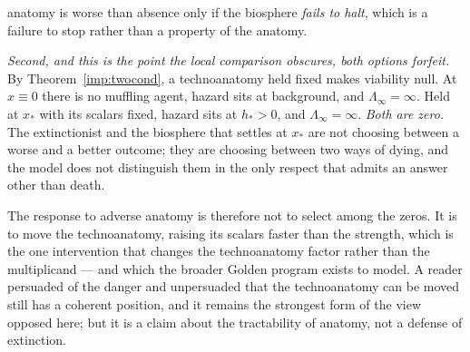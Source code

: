 \begin{remark}
anatomy is worse than absence only if the biosphere \emph{fails to
halt}, which is a failure to stop rather than a property of the anatomy.

\emph{Second, and this is the point the local comparison obscures, both
options forfeit.} By Theorem~\ref{imp:twocond}, a technoanatomy held
fixed makes viability null. At
$x\equiv0$ there is no muffling agent, hazard sits at background, and
$\Lambda_\infty=\infty$. Held at $x_\ast$ with its scalars fixed, hazard sits at
$h_\ast>0$, and $\Lambda_\infty=\infty$. \emph{Both are zero.} The
extinctionist and the biosphere that settles at $x_\ast$ are not
choosing between a worse and a better outcome; they are choosing between
two ways of dying, and the model does not distinguish them in the only
respect that admits an answer other than death.

The response to adverse anatomy is therefore not to select among the
zeros. It is to move the technoanatomy, raising its scalars faster than
the strength, which is the one intervention that changes
the technoanatomy factor rather than the multiplicand --- and which
the broader Golden program exists to model. A reader persuaded of the danger and
unpersuaded that the technoanatomy can be moved still has a coherent position, and
it remains the strongest form of the view opposed here; but it is a
claim about the tractability of anatomy, not a defense of extinction.



\end{remark}
